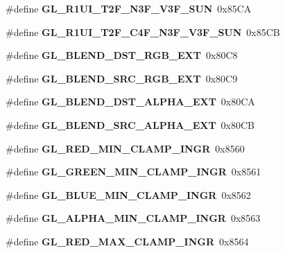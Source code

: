 \begin{DoxyCompactItemize}
\item 
\#define {\bfseries G\+L\+\_\+\+R1\+U\+I\+\_\+\+T2\+F\+\_\+\+N3\+F\+\_\+\+V3\+F\+\_\+\+S\+U\+N}~0x85\+C\+A\label{_s_d_l__opengl_8h_a9d45279d96f56dad3c6676b9946c8b61}

\item 
\#define {\bfseries G\+L\+\_\+\+R1\+U\+I\+\_\+\+T2\+F\+\_\+\+C4\+F\+\_\+\+N3\+F\+\_\+\+V3\+F\+\_\+\+S\+U\+N}~0x85\+C\+B\label{_s_d_l__opengl_8h_aa832e68aab8fd80210b493c7f1e22b5a}

\item 
\#define {\bfseries G\+L\+\_\+\+B\+L\+E\+N\+D\+\_\+\+D\+S\+T\+\_\+\+R\+G\+B\+\_\+\+E\+X\+T}~0x80\+C8\label{_s_d_l__opengl_8h_a6b724151316c69675e0bbc924d0f19a9}

\item 
\#define {\bfseries G\+L\+\_\+\+B\+L\+E\+N\+D\+\_\+\+S\+R\+C\+\_\+\+R\+G\+B\+\_\+\+E\+X\+T}~0x80\+C9\label{_s_d_l__opengl_8h_a8757ee79809302512de0348aa80fbb43}

\item 
\#define {\bfseries G\+L\+\_\+\+B\+L\+E\+N\+D\+\_\+\+D\+S\+T\+\_\+\+A\+L\+P\+H\+A\+\_\+\+E\+X\+T}~0x80\+C\+A\label{_s_d_l__opengl_8h_a649e5e1cfad83a4c4e8c62e21d3be4c6}

\item 
\#define {\bfseries G\+L\+\_\+\+B\+L\+E\+N\+D\+\_\+\+S\+R\+C\+\_\+\+A\+L\+P\+H\+A\+\_\+\+E\+X\+T}~0x80\+C\+B\label{_s_d_l__opengl_8h_a77fadfeb10316263647b8e8b5096e33c}

\item 
\#define {\bfseries G\+L\+\_\+\+R\+E\+D\+\_\+\+M\+I\+N\+\_\+\+C\+L\+A\+M\+P\+\_\+\+I\+N\+G\+R}~0x8560\label{_s_d_l__opengl_8h_ac4cd2410f93ac9e837920b4440f9bc3c}

\item 
\#define {\bfseries G\+L\+\_\+\+G\+R\+E\+E\+N\+\_\+\+M\+I\+N\+\_\+\+C\+L\+A\+M\+P\+\_\+\+I\+N\+G\+R}~0x8561\label{_s_d_l__opengl_8h_a68a59562119c15e21d61acbd14c60691}

\item 
\#define {\bfseries G\+L\+\_\+\+B\+L\+U\+E\+\_\+\+M\+I\+N\+\_\+\+C\+L\+A\+M\+P\+\_\+\+I\+N\+G\+R}~0x8562\label{_s_d_l__opengl_8h_a70c20879b4b67d9ae86af075ff80ea2a}

\item 
\#define {\bfseries G\+L\+\_\+\+A\+L\+P\+H\+A\+\_\+\+M\+I\+N\+\_\+\+C\+L\+A\+M\+P\+\_\+\+I\+N\+G\+R}~0x8563\label{_s_d_l__opengl_8h_a35b4a245afb02e60a0fc21eb8643a0e2}

\item 
\#define {\bfseries G\+L\+\_\+\+R\+E\+D\+\_\+\+M\+A\+X\+\_\+\+C\+L\+A\+M\+P\+\_\+\+I\+N\+G\+R}~0x8564\label{_s_d_l__opengl_8h_a91e132d1883db1deac9658a8a88090bc}


\end{DoxyCompactItemize}
